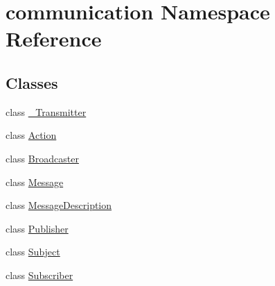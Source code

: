 \hypertarget{namespacecommunication}{}\section{communication Namespace Reference}
\label{namespacecommunication}
\subsection*{Classes}
\begin{DoxyCompactItemize}
\item 
class \hyperlink{classcommunication_1_1__Transmitter}{\+\_\+\+Transmitter}
\item 
class \hyperlink{classcommunication_1_1Action}{Action}
\item 
class \hyperlink{classcommunication_1_1Broadcaster}{Broadcaster}
\item 
class \hyperlink{classcommunication_1_1Message}{Message}
\item 
class \hyperlink{classcommunication_1_1MessageDescription}{Message\+Description}
\item 
class \hyperlink{classcommunication_1_1Publisher}{Publisher}
\item 
class \hyperlink{classcommunication_1_1Subject}{Subject}
\item 
class \hyperlink{classcommunication_1_1Subscriber}{Subscriber}
\end{DoxyCompactItemize}
